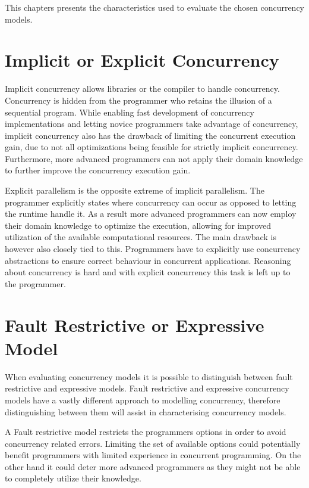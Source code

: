  \makeatletter {}\makeatother
{}
This chapters presents the characteristics used to evaluate the chosen concurrency models.
\label{chap:char}
\section{Implicit or Explicit Concurrency}
Implicit concurrency allows libraries or the compiler to handle concurrency. Concurrency is hidden from the programmer who retains the illusion of a sequential program\cite[p. 59]{sutter2005software}. While enabling fast development of concurrency implementations and letting novice programmers take advantage of concurrency, implicit concurrency also has the drawback of limiting the concurrent execution gain, due to not all optimizations being feasible for strictly implicit concurrency. Furthermore, more advanced programmers can not apply their domain knowledge to further improve the concurrency execution gain.

Explicit parallelism is the opposite extreme of implicit parallelism. The programmer explicitly states where concurrency can occur as opposed to letting the runtime handle it\cite[p. 59]{sutter2005software}. As a result more advanced programmers can now employ their domain knowledge to optimize the execution, allowing for improved utilization of the available computational resources. The main drawback is however also closely tied to this. Programmers have to explicitly use concurrency abstractions to ensure correct behaviour in concurrent applications. Reasoning about concurrency is hard\cite[p. 56]{sutter2005software} and with explicit concurrency this task is left up to the programmer.

\section{Fault Restrictive or Expressive Model}
When evaluating concurrency models it is possible to distinguish between fault restrictive and expressive models. Fault restrictive and expressive concurrency models have a vastly different approach to modelling concurrency, therefore distinguishing between them will assist in characterising concurrency models. 

A Fault restrictive model restricts the programmers options in order to avoid concurrency related errors. Limiting the set of available options could potentially benefit programmers with limited experience in concurrent programming. On the other hand it could deter more advanced programmers as they might not be able to completely utilize their knowledge.

